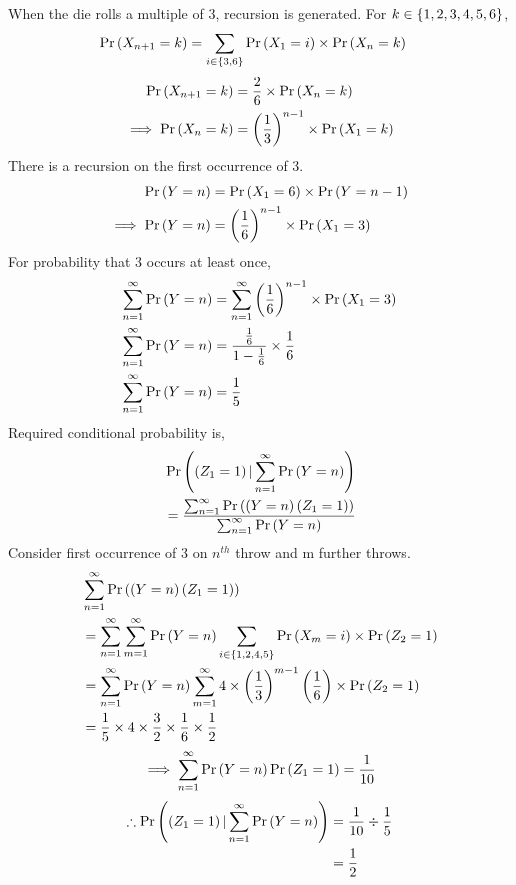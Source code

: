 \documentclass[journal,12pt,twocolumn]{IEEEtran}
\begin{document}
When the die rolls a multiple of 3, recursion is generated. For $k \in \left\{1,2,3,4,5,6\right\}$,
\begin{align}
    \Pr\left(X_{n+1}=k\right) &= \sum_{i \in \left\{3, 6\right\}}\Pr\left(X_1=i\right) \times \Pr\left(X_n=k\right)
    \label{eq:recursionX}
\end{align}
\begin{align}
    \Pr\left(X_{n+1}=k\right) &= \frac{2}{6} \times \Pr\left(X_n=k\right)\\
    \implies \Pr\left(X_{n}=k\right) &= \left(\frac{1}{3}\right)^{n-1} \times \Pr\left(X_1=k\right)
\end{align}
There is a recursion on the first occurrence of 3.
\begin{align}
    \Pr\left(Y=n\right) &= \Pr\left(X_1=6\right) \times \Pr\left(Y= n-1\right) \\
    \implies \Pr\left(Y=n\right) &= \left(\frac{1}{6}\right)^{n-1} \times \Pr\left(X_1=3\right) 
    \label{eq:recursionY}
\end{align}
For probability that 3 occurs at least once,
\begin{align}
    \sum_{n=1}^\infty  \Pr\left(Y=n\right) &= 
     \sum_{n=1}^\infty \left(\frac{1}{6}\right)^{n-1} \times \Pr\left(X_1=3\right) \\
    \sum_{n=1}^\infty \Pr\left(Y=n\right) &= 
     \frac{\frac{1}{6}}{1-\frac{1}{6}} \times \frac{1}{6} \\
   \sum_{n=1}^\infty \Pr\left(Y=n\right) &= \frac{1}{5}
   \label{eq:occurrence3}
\end{align}
Required conditional probability is,
\begin{align}
    &\Pr\left(\left(Z_1=1\right) | \sum_{n=1}^\infty \Pr\left(Y=n\right)\right) \\
    &=\frac{ \sum_{n=1}^\infty \Pr\left(\left(Y=n\right)\left(Z_1 = 1\right)\right) } {\sum_{n=1}^\infty \Pr\left(Y=n\right)}
\end{align}
Consider first occurrence of 3 on $n^{th}$ throw and m further throws.
\begin{align}
    &\sum_{n=1}^\infty \Pr\left(\left(Y=n\right)\left(Z_1 = 1\right)\right) \\
    &=\sum_{n=1}^\infty \sum_{m=1}^\infty \Pr\left(Y=n\right) 
      \sum_{i \in \left\{1,2,4,5\right\}}\Pr\left(X_m = i\right) \times \Pr\left(Z_2 = 1\right) \\
    &=\sum_{n=1}^\infty \Pr\left(Y=n\right) \sum_{m=1}^\infty 
    4 \times \left(\frac{1}{3}\right)^{m-1} \left(\frac{1}{6}\right) \times \Pr\left(Z_2 = 1\right) \\
    &= \frac{1}{5} \times 4 \times \frac{3}{2} \times \frac{1}{6} \times \frac{1}{2}
\end{align}
\begin{align}
    \implies \sum_{n=1}^\infty \Pr\left(Y=n\right) \Pr\left(Z_1 = 1\right) = \frac{1}{10}
\end{align}
\begin{align}
    \therefore \Pr\left(\left(Z_1=1\right) | \sum_{n=1}^\infty \Pr\left(Y=n\right)\right)  &= \frac{1}{10} \div \frac{1}{5} \\
    &= \frac{1}{2}
\end{align}
\end{document}

